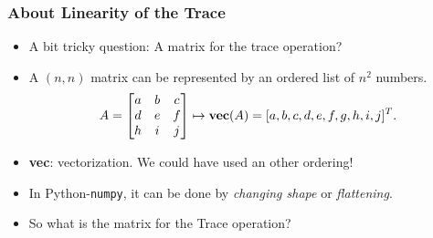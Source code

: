 \documentclass[8pt,dvipsnames]{beamer}
\newcommand{\numpy}{\texttt{numpy}}
\begin{document}
\begin{frame}
  \frametitle{About Linearity of the Trace}
  \begin{itemize}
  \item  A bit tricky question: A matrix for the trace operation? \vfill
  \item A $(n,n)$ matrix can be represented by an ordered list of $n^2$ numbers.
  $$
  A = \begin{bmatrix}
    a & b & c\\
    d & e & f\\
    h & i & j
  \end{bmatrix} \mapsto {\bf vec}(A) = [a,b,c,d,e,f,g,h,i,j]^T.
  $$
  \vfill
  \item {\bf vec}: vectorization. We could have used an other ordering!
  \vfill
  \item In Python-\numpy{}, it can be done by \emph{changing shape} or \emph{flattening}.  \vfill
  \item So what is the matrix for the Trace operation?
  \end{itemize}  
\end{frame}
\end{document}
